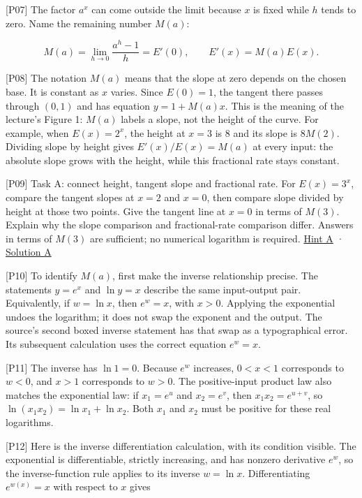 \documentclass[
  11pt,
]{article}
\providecommand{\gt}{>}
\providecommand{\lt}{<}
\begin{document}
{[}P07{]} The factor \(a^x\) can come outside the limit because \(x\) is
fixed while \(h\) tends to zero. Name the remaining number \(M(a)\):

\[
M(a)=\lim_{h\to0}\frac{a^h-1}{h}=E'(0),
\qquad E'(x)=M(a)E(x).
\]

{[}P08{]} The notation \(M(a)\) means that the slope at zero depends on
the chosen base. It is constant as \(x\) varies. Since \(E(0)=1\), the
tangent there passes through \((0,1)\) and has equation \(y=1+M(a)x\).
This is the meaning of the lecture's Figure 1: \(M(a)\) labels a slope,
not the height of the curve. For example, when \(E(x)=2^x\), the height
at \(x=3\) is \(8\) and its slope is \(8M(2)\). Dividing slope by height
gives \(E'(x)/E(x)=M(a)\) at every input: the absolute slope grows with
the height, while this fractional rate stays constant.

{[}P09{]} Task A: connect height, tangent slope and fractional rate. For
\(E(x)=3^x\), compare the tangent slopes at \(x=2\) and \(x=0\), then
compare slope divided by height at those two points. Give the tangent
line at \(x=0\) in terms of \(M(3)\). Explain why the slope comparison
and fractional-rate comparison differ. Answers in terms of \(M(3)\) are
sufficient; no numerical logarithm is required.
\protect\hyperlink{hint-a}{Hint A} ·
\protect\hyperlink{solution-a}{Solution A}

{[}P10{]} To identify \(M(a)\), first make the inverse relationship
precise. The statements \(y=e^x\) and \(\ln y=x\) describe the same
input-output pair. Equivalently, if \(w=\ln x\), then \(e^w=x\), with
\(x\gt0\). Applying the exponential undoes the logarithm; it does not
swap the exponent and the output. The source's second boxed inverse
statement has that swap as a typographical error. Its subsequent
calculation uses the correct equation \(e^w=x\).

{[}P11{]} The inverse has \(\ln1=0\). Because \(e^w\) increases,
\(0\lt x\lt1\) corresponds to \(w\lt0\), and \(x\gt1\) corresponds to
\(w\gt0\). The positive-input product law also matches the exponential
law: if \(x_1=e^u\) and \(x_2=e^v\), then \(x_1x_2=e^{u+v}\), so
\(\ln(x_1x_2)=\ln x_1+\ln x_2\). Both \(x_1\) and \(x_2\) must be
positive for these real logarithms.

{[}P12{]} Here is the inverse differentiation calculation, with its
condition visible. The exponential is differentiable, strictly
increasing, and has nonzero derivative \(e^w\), so the inverse-function
rule applies to its inverse \(w=\ln x\). Differentiating \(e^{w(x)}=x\)
with respect to \(x\) gives
\end{document}
